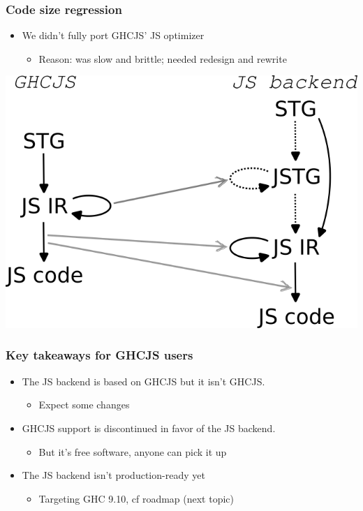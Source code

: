 \documentclass[aspectratio=169]{beamer}
\begin{document}
\begin{frame}
\frametitle{Code size regression}
\begin{itemize}
\item We didn’t fully port GHCJS’ JS optimizer
\begin{itemize}
\item Reason: was slow and brittle; needed redesign and rewrite
\end{itemize}
\end{itemize}
\hspace{1cm}
\begin{center}
\includegraphics[scale=0.4]{images/pipelines.png}
\end{center}
\end{frame}



\begin{frame}
\frametitle{Key takeaways for GHCJS users}
\begin{itemize}
\item The JS backend is based on GHCJS but it isn’t GHCJS.
  \begin{itemize}
    \item Expect some changes
  \end{itemize}
\item GHCJS support is discontinued in favor of the JS backend.
\begin{itemize}
\item But it’s free software, anyone can pick it up
\end{itemize}
\item The JS backend isn't production-ready yet
\begin{itemize}
  \item Targeting GHC 9.10, cf roadmap (next topic)
\end{itemize}
\end{itemize}
\end{frame}
\end{document}

